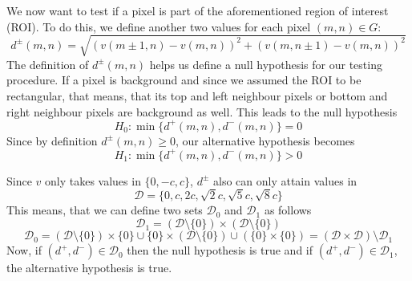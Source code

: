 \documentclass{beamer}
\begin{document}
\begin{frame}
	We now want to test if a pixel is part of the aforementioned region of interest (ROI). To do this, we define another two values for each pixel $(m, n) \in G$:
	\begin{equation*}\label{d}
		d^\pm(m, n) = \sqrt{(v(m \pm 1, n) - v(m, n))^2 + (v(m, n \pm 1) - v(m, n))^2}
	\end{equation*}
	The definition of $d^\pm(m, n)$ helps us define a null hypothesis for our testing procedure. If a pixel is background and since we assumed the ROI to be rectangular, that means, that its top and left neighbour pixels or bottom and right neighbour pixels are background as well. This leads to the null hypothesis
	\begin{equation*}
		H_0 : \min\{ d^+(m, n), d^-(m, n) \} = 0
	\end{equation*}
	Since by definition $d^\pm(m, n) \geq 0$, our alternative hypothesis becomes
	\begin{equation*}
		H_1 : \min\{ d^+(m, n), d^-(m, n) \} > 0
	\end{equation*}
\end{frame}

\begin{frame}
	Since $v$ only takes values in $\{ 0, -c, c \}$, $d^\pm$ also can only attain values in
	\begin{equation*}
		\mathcal{D} = \{ 0, c, 2 c, \sqrt{2} c, \sqrt{5} c, \sqrt{8} c \}
	\end{equation*}
	This means, that we can define two sets $\mathcal{D}_0$ and $\mathcal{D}_1$ as follows
	\begin{equation*}
		\mathcal{D}_1 = ( \mathcal{D} \setminus \{ 0 \} ) \times ( \mathcal{D} \setminus \{ 0 \} )
	\end{equation*}
	\begin{equation*}
		\mathcal{D}_0 = ( \mathcal{D} \setminus \{ 0 \} ) \times \{ 0 \} \cup \{ 0 \} \times ( \mathcal{D} \setminus \{ 0 \} ) \cup ( \{ 0 \} \times \{ 0 \} ) = ( \mathcal{D} \times \mathcal{D} ) \setminus \mathcal{D}_1
	\end{equation*}
	Now, if $(d^+, d^-) \in \mathcal{D}_0$ then the null hypothesis is true and if $(d^+, d^-) \in \mathcal{D}_1$, the alternative hypothesis is true.
\end{frame}
\end{document}
